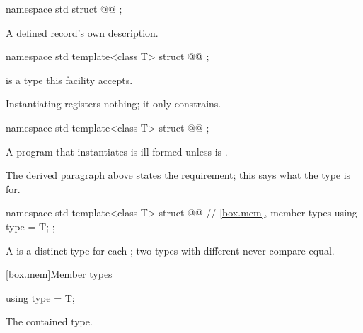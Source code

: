 \begin{codeblock}
namespace std {
  struct @@ {};
}
\end{codeblock}

\pnum
\remarks
A defined record's own description.

\begin{codeblock}
namespace std {
  template<class T>
  struct @@ {};
}
\end{codeblock}

\pnum
\mandates
{} is a type this facility accepts.

\pnum
\remarks
Instantiating  registers nothing; it only constrains.

\begin{codeblock}
namespace std {
  template<class T>
  struct @@ {};
}
\end{codeblock}

\pnum
A program that instantiates  is ill-formed unless  is .

\pnum
\remarks
The derived paragraph above states the requirement; this says what the type is for.

\begin{codeblock}
namespace std {
  template<class T>
  struct @@ {
    // \ref{box.mem}, member types
    using type = T;
  };
}
\end{codeblock}

\pnum
\remarks
A  is a distinct type for each ; two  types with different  never compare equal.

[box.mem]{Member types}

%
\begin{itemdecl}
using type = T;
\end{itemdecl}

\begin{itemdescr}
\pnum
\remarks
The contained type.
\end{itemdescr}
